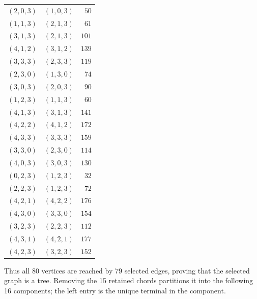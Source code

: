 \begin{longtable}{@{}rrr@{}}
$(2,0,3)$ & $(1,0,3)$ & $50$\\
$(1,1,3)$ & $(2,1,3)$ & $61$\\
$(3,1,3)$ & $(2,1,3)$ & $101$\\
$(4,1,2)$ & $(3,1,2)$ & $139$\\
$(3,3,3)$ & $(2,3,3)$ & $119$\\
$(2,3,0)$ & $(1,3,0)$ & $74$\\
$(3,0,3)$ & $(2,0,3)$ & $90$\\
$(1,2,3)$ & $(1,1,3)$ & $60$\\
$(4,1,3)$ & $(3,1,3)$ & $141$\\
$(4,2,2)$ & $(4,1,2)$ & $172$\\
$(4,3,3)$ & $(3,3,3)$ & $159$\\
$(3,3,0)$ & $(2,3,0)$ & $114$\\
$(4,0,3)$ & $(3,0,3)$ & $130$\\
$(0,2,3)$ & $(1,2,3)$ & $32$\\
$(2,2,3)$ & $(1,2,3)$ & $72$\\
$(4,2,1)$ & $(4,2,2)$ & $176$\\
$(4,3,0)$ & $(3,3,0)$ & $154$\\
$(3,2,3)$ & $(2,2,3)$ & $112$\\
$(4,3,1)$ & $(4,2,1)$ & $177$\\
$(4,2,3)$ & $(3,2,3)$ & $152$\\
\bottomrule
\end{longtable}
Thus all 80 vertices are reached by 79 selected edges, proving that the selected graph is a tree.  Removing the 15 retained chords partitions it into the following 16 components; the left entry is the unique terminal in the component.
